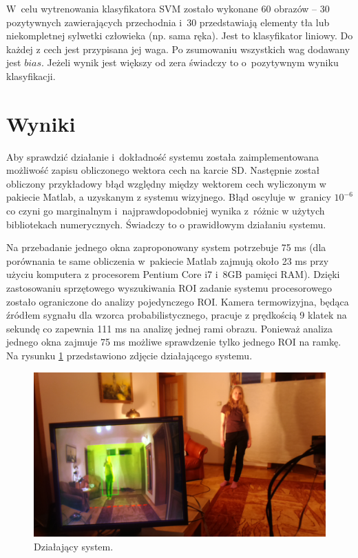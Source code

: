 W~celu wytrenowania klasyfikatora SVM zostało wykonane 60 obrazów -- 30 pozytywnych zawierających przechodnia i~30 przedstawiają elementy tła lub niekompletnej sylwetki człowieka (np. sama ręka).
Jest to klasyfikator liniowy. %
Do każdej z cech jest przypisana jej waga. 
Po zsumowaniu wszystkich wag dodawany jest $bias$. %
Jeżeli wynik jest większy od zera świadczy to o~pozytywnym wyniku klasyfikacji.

\section{Wyniki}

Aby sprawdzić działanie i~dokładność systemu została zaimplementowana możliwość zapisu obliczonego wektora cech na karcie SD.
Następnie został obliczony przykładowy błąd względny między wektorem cech wyliczonym w pakiecie Matlab, a uzyskanym z systemu wizyjnego. %
Błąd oscyluje w~granicy \(10^{-6}\) co czyni go marginalnym i~najprawdopodobniej wynika z~różnic w użytych bibliotekach numerycznych. 
Świadczy to o prawidłowym działaniu systemu.

Na przebadanie jednego okna zaproponowany system potrzebuje 75 ms (dla porównania te same obliczenia w~pakiecie Matlab zajmują około 23 ms przy użyciu komputera z procesorem Pentium Core i7 i~8GB pamięci RAM).
Dzięki zastosowaniu sprzętowego wyszukiwania ROI zadanie systemu procesorowego zostało ograniczone do analizy pojedynczego ROI. 
Kamera termowizyjna, będąca źródłem sygnału dla wzorca probabilistycznego, pracuje z prędkością 9 klatek na sekundę co zapewnia 111 ms na analizę jednej rami obrazu. 
Ponieważ analiza jednego okna zajmuje 75 ms  możliwe sprawdzenie tylko jednego ROI na ramkę. 
Na rysunku \ref{fig:workingSystem} przedstawiono zdjęcie działającego systemu.

\begin{figure}
\centering
\includegraphics[width=0.8\linewidth]{images/workingSystem.jpg}
\caption[Działający system.]{Działający system.}
\label{fig:workingSystem}
\end{figure}

